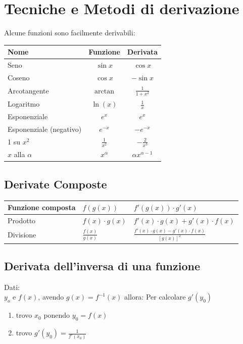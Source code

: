 \documentclass[12pt, a4paper, openany]{book}
\begin{document}
\section{Tecniche e Metodi di derivazione}
Alcune funzioni sono facilmente derivabili:\\
\begin{tabularx}{\textwidth}{|Y|c|c|}
	\hline
	\textbf{Nome}           & \textbf{Funzione} & \textbf{Derivata}     \\
	\hline
	\hline
	Seno                    & $\sin x$          & $\cos x$              \\
	\hline
	Coseno                  & $\cos x$          & $-\sin x$             \\
	\hline
	Arcotangente            & $\arctan$         & $\frac{1}{1+x^2}$     \\
	\hline
	Logaritmo               & $\ln(x) $         & $\frac{1}{x}$         \\
	\hline
	Esponenziale            & $e^x$             & $e^x$                 \\
	\hline
	Esponenziale (negativo) & $e^{-x}$          & $ -e^{-x}$            \\
	 su $x^2$              & $\frac{1}{x^2}$   & $-\frac{2}{x^3}$      \\
	\hline
	$x$ alla $\alpha$       & $x^\alpha$        & $\alpha x^{\alpha-1}$ \\
	\hline
\end{tabularx}

\subsection{Derivate Composte}

\begin{tabularx}{\textwidth}{|l|Y|Y|}
	\hline
	Funzione composta & $f(g(x))$           & $ f'(g(x))\cdot g'(x)$                                \\
	\hline
	Prodotto     & $f(x)\cdot g(x)$    & $f'(x)\cdot g(x) + g'(x)\cdot f(x)$                   \\
	\hline
	Divisione    & $\frac{f(x)}{g(x)}$ & $\frac{f'(x)\cdot g(x) - g'(x) \cdot f(x)}{[g(x)]^2}$ \\
	\hline
\end{tabularx}

\subsection{Derivata dell'inversa di una funzione}
Dati:\\
$y_o$ e $f(x)$, avendo $g(x) = f^{-1}(x)$ allora:
Per calcolare $g'(y_0)$
\begin{enumerate}
	\item trovo $x_0$ ponendo $y_0=f(x)$
	\item trovo $g'(y_0)=\frac{1}{f'(x_0)}$
\end{enumerate}
\end{document}
